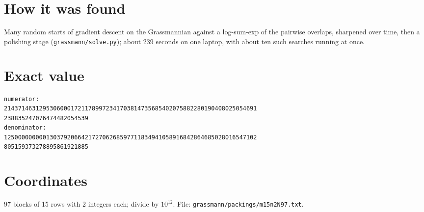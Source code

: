 \documentclass[11pt,a4paper]{article}
\begin{document}
\section{How it was found}
Many random starts of gradient descent on the Grassmannian against a log-sum-exp of the pairwise overlaps, sharpened over time, then a polishing stage (\texttt{grassmann/solve.py}); about 239 seconds on one laptop, with about ten such searches running at once.


\appendix
\section{Exact value}
{\small
\begin{verbatim}
numerator:
214371463129530600017211789972341703814735685402075882280190408025054691
238835247076474482054539
denominator:
125000000000130379206642172706268597711834941058916842864685028016547102
805159373278895861921885
\end{verbatim}}

\section{Coordinates}
97 blocks of 15 rows with 2 integers each; divide by $10^{12}$. File: \texttt{grassmann/packings/m15n2N97.txt}.
{\tiny
\begin{multicols}{4}
\end{multicols}}
\end{document}
